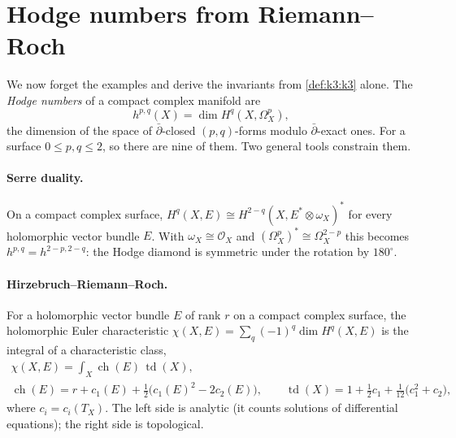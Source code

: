 \section{Hodge numbers from Riemann--Roch}\label{sec:k3:hodge}

We now forget the examples and derive the invariants from \cref{def:k3:k3} alone. The
\emph{Hodge numbers} of a compact complex manifold are
\begin{equation}
  h^{p,q}(X)=\dim H^q(X,\Omega_X^p),
\end{equation}
the dimension of the space of $\bar\partial$-closed $(p,q)$-forms modulo $\bar\partial$-exact
ones.  For a surface
$0\le p,q\le2$, so there are nine of them. Two general tools constrain them.

\paragraph{Serre duality.} On a compact complex surface,
$H^q(X,E)\cong H^{2-q}(X,E^*\otimes\omega_X)^*$ for every holomorphic vector bundle $E$. With
$\omega_X\cong\mathcal{O}_X$ and $(\Omega^p_X)^*\cong\Omega_X^{2-p}$ this becomes
$h^{p,q}=h^{2-p,2-q}$: the Hodge diamond is symmetric under the rotation by $180^\circ$.

\paragraph{Hirzebruch--Riemann--Roch.} For a holomorphic vector
bundle $E$ of rank $r$ on a compact complex surface, the holomorphic Euler characteristic
$\chi(X,E)=\sum_q(-1)^q\dim H^q(X,E)$ is the integral of a characteristic class,
\begin{equation}\label{eq:k3:hrr}
\begin{gathered}
  \chi(X,E)=\int_X \operatorname{ch}(E)\,\operatorname{td}(X),\\
  \operatorname{ch}(E)=r+c_1(E)+\tfrac12\big(c_1(E)^2-2c_2(E)\big),\qquad
  \operatorname{td}(X)=1+\tfrac12c_1+\tfrac1{12}\big(c_1^2+c_2\big),
\end{gathered}
\end{equation}
where $c_i=c_i(T_X)$. The left side is analytic (it counts solutions of differential
equations); the right side is topological. 

